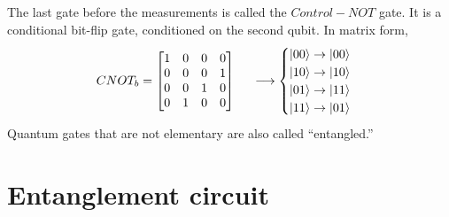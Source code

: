 \documentclass[a4paper,11pt]{article}
\numberwithin{equation}{section}
\theoremstyle{definition}
\begin{document}
\begin{enumerate}
	The last gate before the measurements is called the $Control-NOT$ gate. It is a conditional bit-flip gate, conditioned on the second qubit. In matrix form,
	\begin{align*}
	CNOT_b = \begin{bmatrix}
	1 & 0 & 0 & 0\\
	0 & 0 & 0 & 1\\
	0 & 0 & 1 & 0\\
	0 & 1 & 0 & 0
	\end{bmatrix} \hspace{0.5cm} \longrightarrow \begin{cases}
	\left\vert{00}\right\rangle \to \left\vert{00}\right\rangle\\
	\left\vert{10}\right\rangle \to \left\vert{10}\right\rangle\\
	\left\vert{01}\right\rangle \to \left\vert{11}\right\rangle\\
	\left\vert{11}\right\rangle \to \left\vert{01}\right\rangle
	\end{cases}
	\end{align*}
	Quantum gates that are not elementary are also called ``entangled.''

\end{enumerate}




\section{Entanglement circuit}
\end{document}
